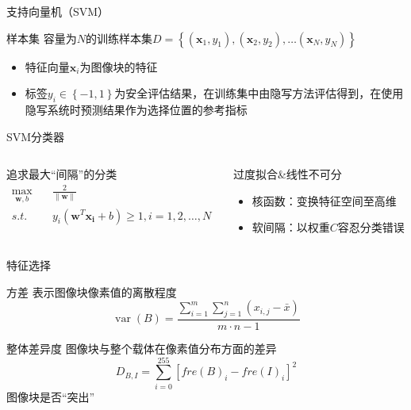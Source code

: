 \documentclass[14pt]{Bredelebeamer}
\begin{document}
\begin{frame}{支持向量机（SVM）}
	\begin{block}{样本集}
		容量为$N$的训练样本集$D = \left\{ {\left( {{{\mathbf{x}}_1},{y_1}} \right),\left( {{{\mathbf{x}}_2},{y_2}} \right), \ldots \left( {{{\mathbf{x}}_N},{y_N}} \right)} \right\}$
		\begin{itemize}
			\item 特征向量${\mathbf{x}_i}$为图像块的特征
			\item 标签$y_i \in \left\{ -1,1\right\}$为安全评估结果，在训练集中由隐写方法评估得到，在使用隐写系统时预测结果作为选择位置的参考指标
		\end{itemize}
	\end{block}

	\begin{alertblock}{SVM分类器}
			\begin{columns}
			\begin{column}{.5\textwidth}
		追求最大“间隔”的分类
		$$
		\begin{aligned}
		\mathop {\max }\limits_{{\mathbf{w}},b} & \quad\frac{2}{{\left\| {\mathbf{w}} \right\|}} \\
		s.t. &\quad {y_i}  \left( {{{\mathbf{w}}^T}{\mathbf{x_i}} + b} \right) \ge 1,i = 1,2, \ldots ,N
		\end{aligned}$$
			\end{column}
					\begin{column}{.41\textwidth}
						过度拟合\&线性不可分
						\begin{itemize}
							\item 核函数：变换特征空间至高维
							\item 软间隔：以权重$C$容忍分类错误
						\end{itemize}
						\end{column}
		\end{columns}
	\end{alertblock}
\end{frame}

\begin{frame}{特征选择}
	\begin{exampleblock}{方差}
		表示图像块像素值的离散程度
		$${\mathop{var}} \left( B \right) = \frac{{\sum\limits_{i = 1}^m {\sum\limits_{j = 1}^n {\left( {{x_{i,j}} - \bar x} \right)} } }}{{m \cdot n - 1}}$$
	\end{exampleblock}

	\begin{alertblock}{整体差异度}
		图像块与整个载体在像素值分布方面的差异
		$${D_{B,I}} =\sum\limits_{i = 0}^{255} {{{\left[ {fre{{\left( B \right)}_i} - fre{{\left( I \right)}_i}} \right]}^2}}$$
		图像块是否“突出”
	\end{alertblock}
\end{frame}
\end{document}
